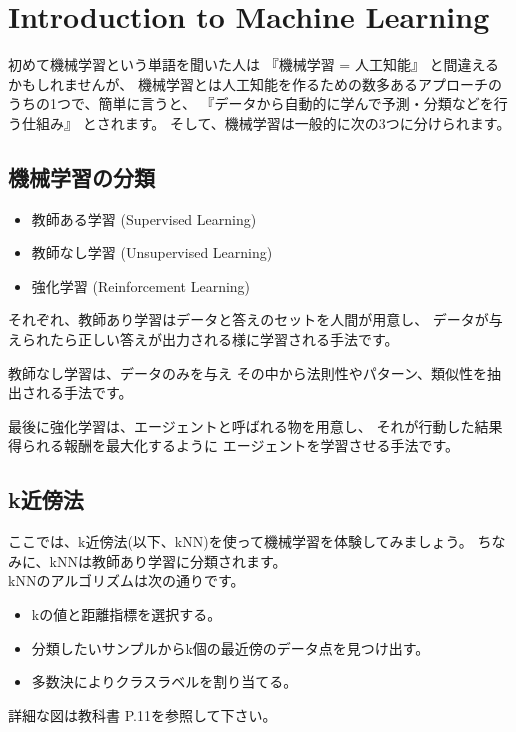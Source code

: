 \chapter{Introduction to Machine Learning}
	初めて機械学習という単語を聞いた人は 『機械学習 = 人工知能』 と間違えるかもしれませんが、
	機械学習とは人工知能を作るための数多あるアプローチのうちの1つで、簡単に言うと、
	『データから自動的に学んで予測・分類などを行う仕組み』
	\cite{essence_of_ML}とされます。
	そして、機械学習は一般的に次の3つに分けられます。
	
	\section{機械学習の分類}
		\begin{itemize}
			\item 教師ある学習 (Supervised Learning)
			\item 教師なし学習 (Unsupervised Learning)
			\item 強化学習 (Reinforcement Learning)
		\end{itemize}
		
		それぞれ、教師あり学習はデータと答えのセットを人間が用意し、
		データが与えられたら正しい答えが出力される様に学習される手法です。
		
		教師なし学習は、データのみを与え
		その中から法則性やパターン、類似性を抽出される手法です。
		
		最後に強化学習は、エージェントと呼ばれる物を用意し、
		それが行動した結果得られる報酬を最大化するように
		エージェントを学習させる手法です。
	
	\newpage
	\section{k近傍法}
		ここでは、k近傍法(以下、kNN)を使って機械学習を体験してみましょう。
		ちなみに、kNNは教師あり学習に分類されます。\\
		
		kNNのアルゴリズムは次の通りです。\cite{python_ML_pro}
		\begin{itemize}
			\item kの値と距離指標を選択する。
			\item 分類したいサンプルからk個の最近傍のデータ点を見つけ出す。
			\item 多数決によりクラスラベルを割り当てる。
		\end{itemize}
		
		詳細な図は教科書 P.11を参照して下さい。
	
